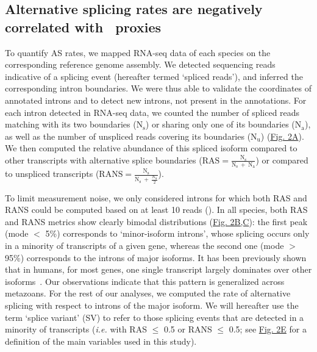 \subsection{Alternative splicing rates are negatively correlated with \Ne~proxies}
\label{sec:SVR_Ne}
To quantify AS rates, we mapped RNA-seq data of each species on the corresponding reference genome assembly. We detected sequencing reads indicative of a splicing event (hereafter termed ‘spliced reads’), and inferred the corresponding intron boundaries. We were thus able to validate the coordinates of annotated introns and to detect new introns, not present in the annotations. For each intron detected in RNA-seq data, we counted the number of spliced reads matching with its two boundaries ($\mathrm{N_s}$) or sharing only one of its boundaries ($\mathrm{N_a}$), as well as the number of unspliced reads covering its boundaries ($\mathrm{N_u}$) (\hyperref[fig:AS2]{Fig. 2A}). We then computed the relative abundance of this spliced isoform compared to other transcripts with alternative splice boundaries ($\mathrm{RAS=\frac{N_s}{N_s~+~{N_a}}}$) or compared to unspliced transcripts ($\mathrm{RANS=\frac{N_s}{N_s~+~\frac{N_u}{2}}}$).


To limit measurement noise, we only considered introns for which both RAS and RANS could be computed based on at least 10 reads (). In all species, both RAS and RANS metrics show clearly bimodal distributions (\hyperref[fig:AS2]{Fig. 2B,C}): the first peak (mode $<$ 5\%) corresponds to ‘minor-isoform introns’, whose splicing occurs only in a minority of transcripts of a given gene, whereas the second one (mode $>$ 95\%) corresponds to the introns of major isoforms. It has been previously shown that in humans, for most genes, one single transcript largely dominates over other isoforms~\citep{tress_alternative_2017, gonzalez-porta_transcriptome_2013}. Our observations indicate that this pattern is generalized across metazoans. For the rest of our analyses, we computed the rate of alternative splicing with respect to introns of the major isoform. We will hereafter use the term ‘splice variant’ (\acrshort{SV}) to refer to those splicing events that are detected in a minority of transcripts (\textit{i.e.} with RAS $\leq$ 0.5 or RANS $\leq$ 0.5; see \hyperref[fig:AS2]{Fig. 2E} for a definition of the main variables used in this study).

